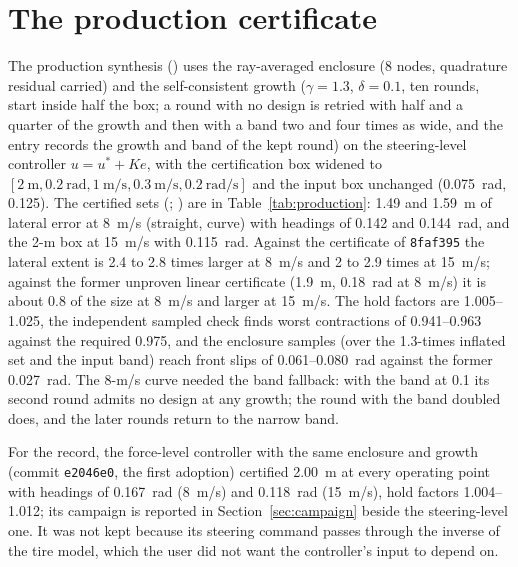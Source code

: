 \documentclass[11pt]{article}
\begin{document}
\section{The production certificate}
\label{sec:production}
The production synthesis () uses the
ray-averaged enclosure (8 nodes, quadrature residual carried) and the
self-consistent growth ($\gamma=1.3$, $\delta=0.1$, ten rounds, start inside
half the box; a round with no design is retried with half and a quarter of
the growth and then with a band two and four times as wide, and the entry
records the growth and band of the kept round) on the steering-level
controller $u=u^*+Ke$, with the certification box widened to
$[2~\text{m},0.2~\text{rad},1~\text{m/s},0.3~\text{m/s},0.2~\text{rad/s}]$
and the input box unchanged (0.075~rad, 0.125). The certified sets
(; ) are in
Table~\ref{tab:production}: 1.49 and 1.59~m of lateral error at 8~m/s
(straight, curve) with headings of 0.142 and 0.144~rad, and the 2-m box at
15~m/s with 0.115~rad. Against the certificate of \texttt{8faf395} the
lateral extent is 2.4 to 2.8 times larger at 8~m/s and 2 to 2.9 times at
15~m/s; against the former unproven linear certificate (1.9~m, 0.18~rad at
8~m/s) it is about 0.8 of the size at 8~m/s and larger at 15~m/s. The hold
factors are 1.005--1.025, the independent sampled check finds worst
contractions of 0.941--0.963 against the required 0.975, and the enclosure
samples (over the 1.3-times inflated set and the input band) reach front
slips of 0.061--0.080~rad against the former 0.027~rad. The 8-m/s curve
needed the band fallback: with the band at 0.1 its second round admits no
design at any growth; the round with the band doubled does, and the later
rounds return to the narrow band.

For the record, the force-level controller with the same enclosure and
growth (commit \texttt{e2046e0}, the first adoption) certified 2.00~m at
every operating point with headings of 0.167~rad (8~m/s) and 0.118~rad
(15~m/s), hold factors 1.004--1.012; its campaign is reported in
Section~\ref{sec:campaign} beside the steering-level one. It was not kept
because its steering command passes through the inverse of the tire model,
which the user did not want the controller's input to depend on.
\end{document}
